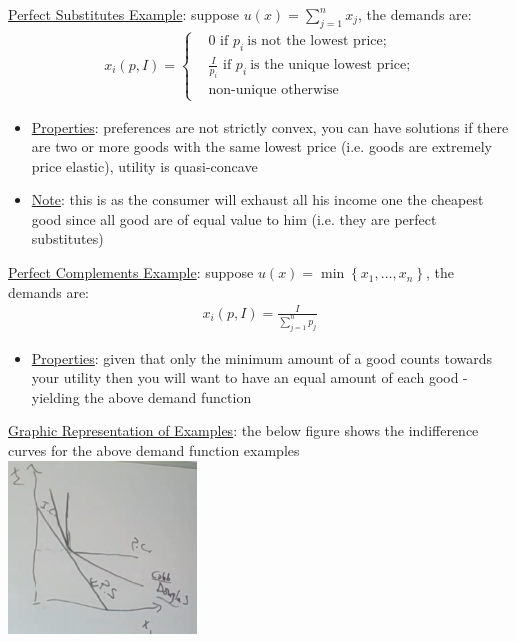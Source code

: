 \documentclass{article}
\begin{document}
  \par
  \underline{Perfect Substitutes Example}: suppose $u(x) = \sum_{j=1}^{n}  x_{j}$, the demands are:
  \begin{gather*}
    x_{i}(p,I) =
    \begin{cases}
     & 0 \text{ if } p_{i} \ \text{is not the lowest price;} \\
     & \tfrac{I}{p_{i}} \text{ if } p_{i} \ \text{is the unique lowest price;} \\
     & \text{non-unique otherwise}
    \end{cases}
  \end{gather*}
  \par
  \begin{itemize}
    \item  \underline{Properties}: preferences are not strictly convex, you can have solutions if there are two or more goods with the same lowest price (i.e. goods are extremely price elastic), utility is quasi-concave
  \end{itemize}
  \par
  \begin{itemize}
    \item  \underline{Note}: this is as the consumer will exhaust all his income one the cheapest good since all good are of equal value to him (i.e. they are perfect substitutes)
  \end{itemize}
  \par
  \underline{Perfect Complements Example}: suppose $u(x) = \min \left\{x_{1}, \dots, x_{n} \right\}$, the demands are:
  \begin{gather*}
    x_{i}(p,I) = \frac{I}{\sum_{j=1}^{n}p_{j}}
  \end{gather*}
  \par
  \begin{itemize}
    \item  \underline{Properties}: given that only the minimum amount of a good counts towards your utility then you will want to have an equal amount of each good - yielding the above demand function
  \end{itemize}
  \underline{Graphic Representation of Examples}: the below figure shows the indifference curves for the above demand function examples \\
  \includegraphics[width=5cm, height=5 cm]{pic23}
\end{document}
